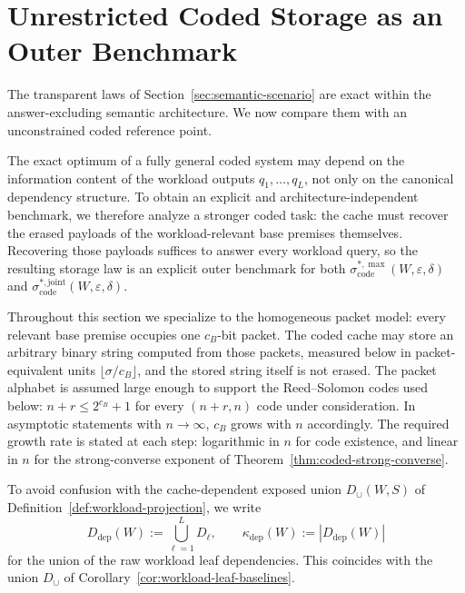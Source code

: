 \documentclass[journal]{IEEEtran}
\numberwithin{equation}{section}
\begin{document}
\section{Unrestricted Coded Storage as an Outer Benchmark}
\label{sec:coded-outer}

The transparent laws of Section~\ref{sec:semantic-scenario} are exact within
the answer-excluding semantic architecture.  We now compare them with an
unconstrained coded reference point.

The exact optimum of a fully general coded system may depend on the
information content of the workload outputs \(q_1,\ldots,q_L\), not only on
the canonical dependency structure.  To obtain an explicit and
architecture-independent benchmark, we therefore analyze a stronger coded
task: the cache must recover the erased payloads of the workload-relevant
base premises themselves.  Recovering those payloads suffices to answer
every workload query, so the resulting storage law is an explicit outer
benchmark for both \(\sigma_{\mathrm{code}}^{*,\max}(W,\varepsilon,\delta)\)
and \(\sigma_{\mathrm{code}}^{*,\mathrm{joint}}(W,\varepsilon,\delta)\).

Throughout this section we specialize to the homogeneous packet model:
every relevant base premise occupies one \(c_B\)-bit packet.  The coded
cache may store an arbitrary binary string computed from those packets,
measured below in packet-equivalent units \(\lfloor\sigma/c_B\rfloor\), and
the stored string itself is not erased.  The packet alphabet is assumed
large enough to support the Reed--Solomon codes used below:
\(n+r\le 2^{c_B}+1\) for every \((n+r,n)\) code under consideration.  In
asymptotic statements with \(n\to\infty\), \(c_B\) grows with \(n\)
accordingly.  The required growth rate is stated at each step: logarithmic
in \(n\) for code existence, and linear in \(n\) for the strong-converse
exponent of Theorem~\ref{thm:coded-strong-converse}.

To avoid confusion with the cache-dependent exposed union
\(D_{\cup}(W,S)\) of Definition~\ref{def:workload-projection}, we write
\begin{equation}
  D_{\mathrm{dep}}(W)
  :=
  \bigcup_{\ell=1}^{L}D_\ell,
  \qquad
  \kappa_{\mathrm{dep}}(W)
  :=
  |D_{\mathrm{dep}}(W)|
\label{eq:def-workload-dependency-union}
\end{equation}
for the union of the raw workload leaf dependencies.  This coincides with
the union \(D_{\cup}\) of Corollary~\ref{cor:workload-leaf-baselines}.
\end{document}
